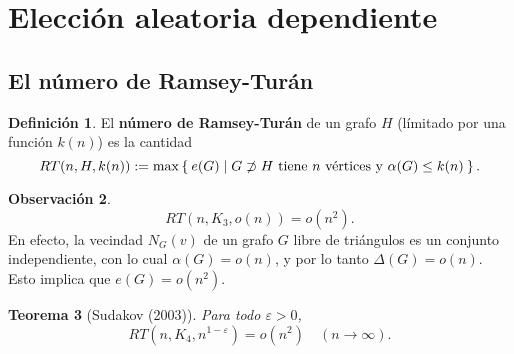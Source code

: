 \documentclass[12pt]{report}
\theoremstyle{plain}
\newtheorem{theorem}{Teorema}[section]
\theoremstyle{definition}
\newtheorem{definition}[theorem]{Definición}
\newtheorem{obs}[theorem]{Observación}
\begin{document}
\section{Elección aleatoria dependiente}

\subsection{El número de Ramsey-Turán}

\begin{definition}
El \textbf{número de Ramsey-Turán} de un grafo $H$ (límitado por una función $k(n)$) es la cantidad
\[
RT (n, H, k(n)) := \max \Set{e(G) | G \not \supset H \text{ tiene $n$ vértices y } \alpha (G) \leq k(n)}.
\]
\end{definition}

\begin{obs}
\[
    RT (n, K_3, o (n)) = o(n^2).
\]
En efecto, la vecindad $N_G (v)$ de un grafo $G$ libre de triángulos es un conjunto independiente, con lo cual $\alpha (G) = o (n)$, y por lo tanto $\Delta (G) = o (n)$. Esto implica que $e(G) = o (n^2)$.
\end{obs}

\begin{theorem}[Sudakov (2003)]
Para todo $\varepsilon > 0$,
\[
    RT (n, K_4, n^{1-\varepsilon}) = o (n^2) \quad (n \to \infty).
\]

\end{theorem}
\end{document}
